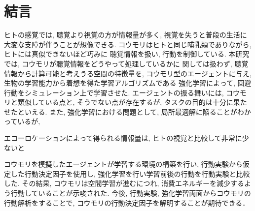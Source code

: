 \documentclass[../main]{subfiles}
\begin{document}
\newpage
\chapter*{結言}
\label{chap:summary}
ヒトの感覚では, 聴覚より視覚の方が情報量が多く, 
視覚を失うと普段の生活に大変な支障が伴うことが想像できる.
コウモリはヒトと同じ哺乳類でありながら, 
ヒトには真似できないほど巧みに
聴覚情報を扱い, 行動を制御している.
本研究では, コウモリが聴覚情報をどうやって処理しているかに
関しては扱わず, 
聴覚情報から計算可能と考えうる空間の特徴量を, 
コウモリ型のエージェントに与え, 
生物の学習能力から着想を得た学習アルゴリズムである 
強化学習によって, 回避行動をシミュレーション上で学習させた.
エージェントの振る舞いには, 
コウモリと類似している点と, そうでない点が存在するが, 
タスクの目的は十分に果たせたといえる.
また, 強化学習における問題として, 
局所最適解に陥ることがわかっているが, 



エコーロケーションによって得られる情報量は, 
ヒトの視覚と比較して非常に少ないと

コウモリを模擬したエージェントが学習する環境の構築を行い, 
行動実験から仮定した行動決定因子を使用し, 
強化学習を行い学習前後の行動を行動実験と比較した.
その結果, コウモリは空間学習が進むにつれ, 
消費エネルギーを減少するよう行動していることが示唆された.
今後, 行動実験, 強化学習両面からコウモリの行動解析をすることで, 
コウモリの行動決定因子を解明することが期待できる．
\end{document}
